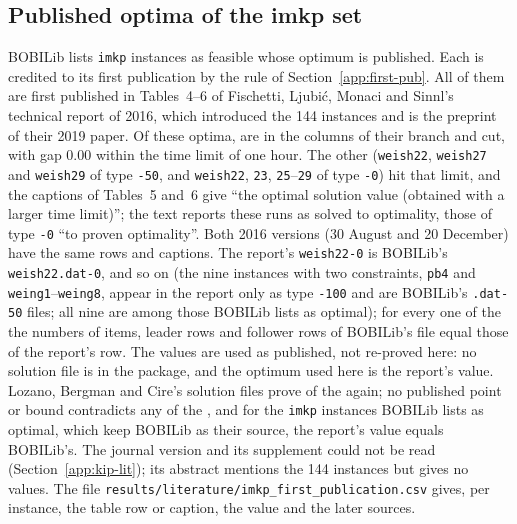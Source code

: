 \subsection{Published optima of the imkp set}\label{app:mkip-imkp}

BOBILib lists \NumLitImkp{} \texttt{imkp} instances as feasible whose optimum
is published. Each is credited to its first publication by the rule of
Section~\ref{app:first-pub}. All of them are first published in Tables~4--6 of
Fischetti, Ljubi\'c, Monaci and Sinnl's technical report of
2016,\cite{fischetti2016monotonicity} which introduced the 144 instances and is
the preprint of their 2019 paper.\cite{fischetti2019interdiction} Of
these optima, \NumLitImkpTable{} are in the columns of their branch and cut,
with gap 0.00 within the time limit of one hour. The other \NumLitImkpCaption{}
(\texttt{weish22}, \texttt{weish27} and \texttt{weish29} of type \texttt{-50},
and \texttt{weish22}, \texttt{23}, \texttt{25}--\texttt{29} of type
\texttt{-0}) hit that limit, and the captions of Tables~5 and~6 give ``the
optimal solution value (obtained with a larger time limit)''; the text
reports these runs as solved to optimality, those of type \texttt{-0} ``to
proven optimality''. Both 2016 versions (30 August and 20 December) have the
same rows and captions. The report's \texttt{weish22-0} is BOBILib's
\texttt{weish22.dat-0}, and so on (the nine instances with two constraints,
\texttt{pb4} and \texttt{weing1}--\texttt{weing8}, appear in the report only as
type \texttt{-100} and are BOBILib's \texttt{.dat-50} files; all nine are among
those BOBILib lists as optimal); for every one of the \NumLitImkp{} the numbers
of items, leader rows and follower rows of BOBILib's file equal those of the
report's row. The values are used as published, not re-proved here: no
solution file is in the package, and the optimum used here is the report's
value. Lozano, Bergman and Cire's solution files\cite{lozano_dbo_repo} prove
\NumLitImkpLaterLozano{} of the \NumLitImkp{} again; no published point or
bound contradicts any of the \NumLitImkp{}, and for the \NumBobiOptImkp{} \texttt{imkp}
instances BOBILib lists as optimal, which keep BOBILib as their source, the
report's value equals BOBILib's. The journal version and its supplement could
not be read (Section~\ref{app:kip-lit}); its abstract mentions the 144
instances but gives no values. The file
\texttt{results/literature/imkp\_first\_publication.csv} gives, per
instance, the table row or caption, the value and the later sources.
